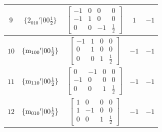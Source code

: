 \documentclass[fleqn,8pt]{jsarticle}
\begin{document}
\begin{longtable}{ccccc}
$ 9 $ & $ \{2{}_{010}{}'|0 0 \frac{1}{2}\} $ & $ \begin{bmatrix} -1 & 0 & 0 & 0 \\ -1 & 1 & 0 & 0 \\ 0 & 0 & -1 & \frac{1}{2} \end{bmatrix} $ & $ 1 $ & $ -1 $ \\ \hline
$ 10 $ & $ \{{\rm m}_{100}{}'|0 0 \frac{1}{2}\} $ & $ \begin{bmatrix} -1 & 1 & 0 & 0 \\ 0 & 1 & 0 & 0 \\ 0 & 0 & 1 & \frac{1}{2} \end{bmatrix} $ & $ -1 $ & $ -1 $ \\ \hline
$ 11 $ & $ \{{\rm m}_{110}{}'|0 0 \frac{1}{2}\} $ & $ \begin{bmatrix} 0 & -1 & 0 & 0 \\ -1 & 0 & 0 & 0 \\ 0 & 0 & 1 & \frac{1}{2} \end{bmatrix} $ & $ -1 $ & $ -1 $ \\ \hline
$ 12 $ & $ \{{\rm m}_{010}{}'|0 0 \frac{1}{2}\} $ & $ \begin{bmatrix} 1 & 0 & 0 & 0 \\ 1 & -1 & 0 & 0 \\ 0 & 0 & 1 & \frac{1}{2} \end{bmatrix} $ & $ -1 $ & $ -1 $ \\
\end{longtable}
\end{document}
